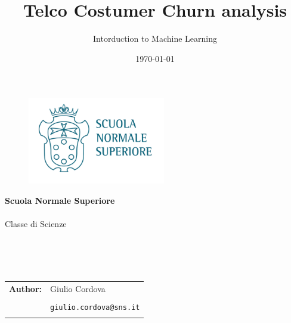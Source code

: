 \documentclass[a4paper,11pt]{article}
\title{Telco Costumer Churn analysis}
\author{Intorduction to Machine Learning}
\date{\today}
\begin{document}
			\thispagestyle{empty}
			\begin{figure}
				\includegraphics[width=60mm,right]{./1 logo.png}
			\end{figure}
			\vspace*{-38mm}\hspace{-6mm}\textbf{\textcolor{blunipi}{\large{Scuola Normale Superiore}}}\\\\
			\hspace{-2mm}\textcolor{blunipi}{\large{Classe di Scienze}}
			
			\vspace{15mm}
			\begin{center}
				\textcolor{blunipi}{\huge{\textbf{\thetitle}}}\\\vspace*{7mm}
			\textcolor{blunipi}{\theauthor}\\\vspace*{10mm}
				\textcolor{blunipi}{\thedate}\\\vspace*{10mm}
				
				\begin{tabular}{rl}
					\textbf{Author:} 
					& Giulio Cordova \\ 
                    & \\
					& \texttt{giulio.cordova@sns.it}\\\\
                    
					
				\end{tabular}
				\vspace*{5mm}
\end{center}
\tableofcontents
		\restoregeometry
        \setcounter{page}{1}
\pagestyle{plain}
\end{document}
